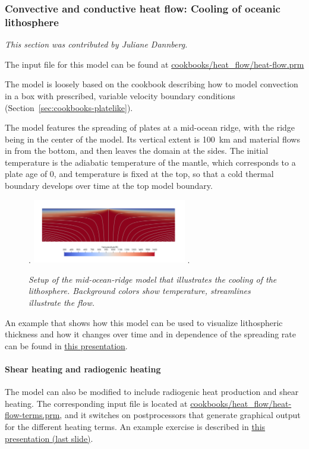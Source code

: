 \subsubsection{Convective and conductive heat flow: Cooling of oceanic lithosphere}
\label{sec:cookbooks-heat-flow}
\textit{This section was contributed by Juliane Dannberg.}

The input file for this model can be found at \url{cookbooks/heat_flow/heat-flow.prm}

The model is loosely based on the cookbook describing how to model convection in a box with prescribed, 
variable velocity boundary conditions (Section~\ref{sec:cookbooks-platelike}). 

The model features the spreading of plates at a mid-ocean ridge, with the ridge being in the center of the model. 
Its vertical extent is 100~km and material flows in from the bottom, and then leaves the domain at the sides. 
The initial temperature is the adiabatic temperature of the mantle, which corresponds to a plate age of 0, 
and temperature is fixed at the top, so that a cold thermal boundary develops over time at the top model boundary.

\begin{figure}
\phantom.
\hfill
\includegraphics[width=0.6\textwidth]{cookbooks/heat_flow/doc/mid-ocean-ridge.png}
\hfill
\phantom.
\caption{\it Setup of the mid-ocean-ridge model that illustrates the cooling of the lithosphere.
  Background colors show temperature, streamlines illustrate the flow.}
\label{fig:convection-box-iterations}
\end{figure}

An example that shows how this model can be used to visualize lithospheric thickness and how it changes over time and 
in dependence of the spreading rate can be found in \href{https://www.dropbox.com/s/tdfj9pi2mdq0fhe/04_geophysics_lecture_01_13.pdf?dl=0}{this presentation}. 

\paragraph{Shear heating and radiogenic heating} 
The model can also be modified to include radiogenic heat production and shear heating. 
The corresponding input file is located at \url{cookbooks/heat_flow/heat-flow-terms.prm}, and it switches on 
postprocessors that generate graphical output for the different heating terms. 
An example exercise is described in \href{https://www.dropbox.com/s/jh2v6vgje4cft5n/05_geophysics_lecture_01_27.pdf?dl=0}{this presentation (last slide)}. 


